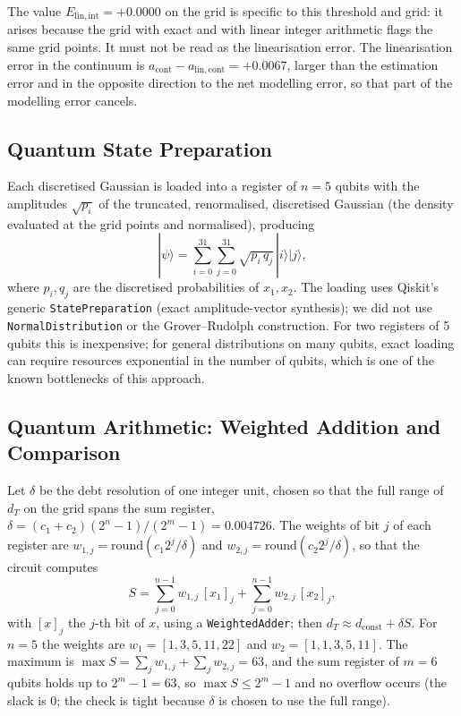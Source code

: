 \documentclass[pdflatex,sn-mathphys-num]{sn-jnl}%
\theoremstyle{thmstyleone}%
\theoremstyle{thmstyletwo}%
\theoremstyle{thmstylethree}%
\begin{document}
The value $E_{\mathrm{lin,int}}=\ensuremath{+0.0000}$ on the grid is specific to this threshold and grid: it arises because the grid with exact and with linear integer arithmetic flags the same grid points. It must not be read as the linearisation error. The linearisation error in the continuum is $a_{\mathrm{cont}}-a_{\mathrm{lin,cont}}=\ensuremath{+0.0067}$, larger than the estimation error and in the opposite direction to the net modelling error, so that part of the modelling error cancels.

\subsection{Quantum State Preparation}

Each discretised Gaussian is loaded into a register of $n=5$ qubits with the amplitudes $\sqrt{p_i}$ of the truncated, renormalised, discretised Gaussian (the density evaluated at the grid points and normalised), producing
\begin{equation}
|\psi\rangle = \sum_{i=0}^{31}\sum_{j=0}^{31}\sqrt{p_i\,q_j}\,|i\rangle|j\rangle,
\end{equation}
where $p_i,q_j$ are the discretised probabilities of $x_1,x_2$. The loading uses Qiskit's generic \texttt{StatePreparation} (exact amplitude-vector synthesis); we did not use \texttt{NormalDistribution} or the Grover--Rudolph construction. For two registers of 5 qubits this is inexpensive; for general distributions on many qubits, exact loading can require resources exponential in the number of qubits, which is one of the known bottlenecks of this approach.

\subsection{Quantum Arithmetic: Weighted Addition and Comparison}

Let $\delta$ be the debt resolution of one integer unit, chosen so that the full range of $d_T$ on the grid spans the sum register, $\delta=(c_1+c_2)(2^n-1)/(2^m-1)=0.004726$. The weights of bit $j$ of each register are $w_{1,j}=\mathrm{round}(c_1 2^j/\delta)$ and $w_{2,j}=\mathrm{round}(c_2 2^j/\delta)$, so that the circuit computes
\begin{equation}
S=\sum_{j=0}^{n-1}w_{1,j}\,[x_1]_j+\sum_{j=0}^{n-1}w_{2,j}\,[x_2]_j ,
\end{equation}
with $[x]_j$ the $j$-th bit of $x$, using a \texttt{WeightedAdder}; then $d_T\approx d_{\mathrm{const}}+\delta S$. For $n=5$ the weights are $w_1=[1,3,5,11,22]$ and $w_2=[1,1,3,5,11]$. The maximum is $\max S=\sum_j w_{1,j}+\sum_j w_{2,j}=63$, and the sum register of $m=6$ qubits holds up to $2^{m}-1=63$, so $\max S\le 2^m-1$ and no overflow occurs (the slack is 0; the check is tight because $\delta$ is chosen to use the full range).
\end{document}
